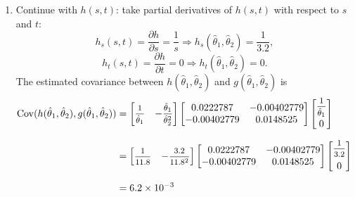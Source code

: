 \begin{solution}
\begin{enumerate}
        \item Continue with $h(s,t)$: take partial derivatives of $h(s,t)$ with respect to $s$ and $t$:
        \[
            h_s(s,t) = \frac{\partial h}{\partial s} = \frac{1}{s} \Longrightarrow h_s(\hat{\theta}_1, \hat{\theta}_2) = \frac{1}{3.2},
        \]
        \[
            h_t(s,t) = \frac{\partial h}{\partial t} = 0 \Longrightarrow h_t(\hat{\theta}_1, \hat{\theta}_2) = 0.
        \]
        The estimated covariance between $h(\hat{\theta}_1, \hat{\theta}_2)$ and $g(\hat{\theta}_1, \hat{\theta}_2)$ is
        \begin{align*}
            \cov(h(\hat{\theta}_1, \hat{\theta}_2), g(\hat{\theta}_1, \hat{\theta}_2)) &=
            \begin{bmatrix}
                \mfrac{1}{\hat{\theta}_1} &
                -\mfrac{\hat{\theta}_1}{\hat{\theta}_2^2}
            \end{bmatrix}
            \begin{bmatrix}
                0.0222787 & -0.00402779 \\
                -0.00402779 & 0.0148525
            \end{bmatrix}
            \begin{bmatrix}
                \mfrac{1}{\hat{\theta}_1} \\[0.6em]
                0
            \end{bmatrix}\\[0.6em]
            &= \begin{bmatrix}
                \mfrac{1}{11.8} &
                -\mfrac{3.2}{11.8^2}
            \end{bmatrix}
            \begin{bmatrix}
                0.0222787 & -0.00402779 \\
                -0.00402779 & 0.0148525
            \end{bmatrix}
            \begin{bmatrix}
                \mfrac{1}{3.2} \\[0.6em]
                0
            \end{bmatrix}\\[0.6em]
            &= 6.2 \times 10^{-3}
        \end{align*}
    \end{enumerate}
\end{solution}